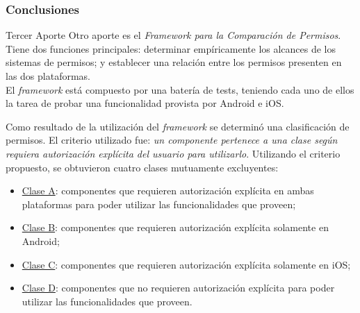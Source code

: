 \begin{frame}
 \frametitle{Conclusiones}
 \begin{footnotesize}
 \begin{exampleblock}{Tercer Aporte}
Otro aporte es el \emph{Framework para la Comparación de Permisos}. \pause Tiene dos funciones principales: \pause determinar empíricamente los alcances de los sistemas de permisos; \pause y establecer una relación entre los permisos presenten en las dos plataformas.\\ \pause
El \emph{framework} está compuesto por una batería de tests, teniendo cada uno de ellos la tarea de probar una funcionalidad provista por Android e iOS.
 \end{exampleblock} \pause
 \begin{exampleblock}{}
Como resultado de la utilización del \emph{framework} se determinó una clasificación de permisos. \pause El criterio utilizado fue: \emph{un componente pertenece a una clase según requiera autorización explícita del usuario para utilizarlo}. \pause Utilizando el criterio propuesto, se obtuvieron cuatro clases mutuamente excluyentes:\pause
  \begin{scriptsize}
  \begin{itemize}[<+->]
    \item \underline{Clase A}: componentes que requieren autorización explícita en ambas plataformas para poder utilizar las funcionalidades que proveen;
    \item \underline{Clase B}: componentes que requieren autorización explícita solamente en Android;
    \item \underline{Clase C}: componentes que requieren autorización explícita solamente en iOS;
    \item \underline{Clase D}: componentes que no requieren autorización explícita para poder utilizar las funcionalidades que proveen.
  \end{itemize}
  \end{scriptsize}
 \end{exampleblock}
 \end{footnotesize}
\end{frame}
